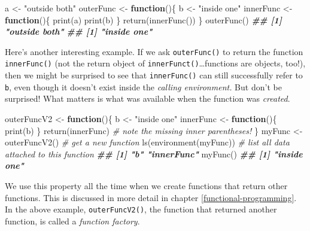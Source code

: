 \documentclass[
  12pt,
]{krantz}
\makeatletter
\newenvironment{Shaded}{\begin{snugshade}}{\end{snugshade}}
\newcommand{\CommentTok}[1]{\textcolor[rgb]{0.37,0.37,0.37}{\textit{#1}}}
\newcommand{\ControlFlowTok}[1]{\textcolor[rgb]{0.27,0.27,0.27}{\textbf{#1}}}
\newcommand{\DocumentationTok}[1]{\textcolor[rgb]{0.37,0.37,0.37}{\textbf{\textit{#1}}}}
\newcommand{\FunctionTok}[1]{\textcolor[rgb]{0,0,0}{#1}}
\newcommand{\NormalTok}[1]{#1}
\newcommand{\OtherTok}[1]{\textcolor[rgb]{0.37,0.37,0.37}{#1}}
\newcommand{\StringTok}[1]{\textcolor[rgb]{0.5,0.5,0.5}{#1}}
\newenvironment{kframe}{%
\medskip{}
\setlength{\fboxsep}{.8em}
 \def\at@end@of@kframe{}%
 \ifinner\ifhmode%
  \def\at@end@of@kframe{\end{minipage}}%
  \begin{minipage}{\columnwidth}%
 \fi\fi%
 \def\FrameCommand##1{\hskip\@totalleftmargin \hskip-\fboxsep
 \colorbox{shadecolor}{##1}\hskip-\fboxsep
     \hskip-\linewidth \hskip-\@totalleftmargin \hskip\columnwidth}%
 \MakeFramed {\advance\hsize-\width
   \@totalleftmargin\z@ \linewidth\hsize
   \@setminipage}}%
 {\par\unskip\endMakeFramed%
 \at@end@of@kframe}
\renewenvironment{Shaded}{\begin{kframe}}{\end{kframe}}
\makeatother
\begin{document}
\begin{Shaded}
\begin{Highlighting}[]
\NormalTok{a }\OtherTok{\textless{}{-}} \StringTok{"outside both"}
\NormalTok{outerFunc }\OtherTok{\textless{}{-}} \ControlFlowTok{function}\NormalTok{()\{}
\NormalTok{  b }\OtherTok{\textless{}{-}} \StringTok{"inside one"}
\NormalTok{  innerFunc }\OtherTok{\textless{}{-}} \ControlFlowTok{function}\NormalTok{()\{}
    \FunctionTok{print}\NormalTok{(a) }
    \FunctionTok{print}\NormalTok{(b)}
\NormalTok{  \}}
  \FunctionTok{return}\NormalTok{(}\FunctionTok{innerFunc}\NormalTok{())}
\NormalTok{\}}
\FunctionTok{outerFunc}\NormalTok{()}
\DocumentationTok{\#\# [1] "outside both"}
\DocumentationTok{\#\# [1] "inside one"}
\end{Highlighting}
\end{Shaded}

Here's another interesting example. If we ask \texttt{outerFunc()} to return the function \texttt{innerFunc()} (not the return object of \texttt{innerFunct()}\ldots functions are objects, too!), then we might be surprised to see that \texttt{innerFunc()} can still successfully refer to \texttt{b}, even though it doesn't exist inside the \emph{calling environment.} But don't be surprised! What matters is what was available when the function was \emph{created}.

\begin{Shaded}
\begin{Highlighting}[]
\NormalTok{outerFuncV2 }\OtherTok{\textless{}{-}} \ControlFlowTok{function}\NormalTok{()\{}
\NormalTok{  b }\OtherTok{\textless{}{-}} \StringTok{"inside one"}
\NormalTok{  innerFunc }\OtherTok{\textless{}{-}} \ControlFlowTok{function}\NormalTok{()\{}
    \FunctionTok{print}\NormalTok{(b)}
\NormalTok{  \}}
  \FunctionTok{return}\NormalTok{(innerFunc) }\CommentTok{\# note the missing inner parentheses!}
\NormalTok{\}}
\NormalTok{myFunc }\OtherTok{\textless{}{-}} \FunctionTok{outerFuncV2}\NormalTok{() }\CommentTok{\# get a new function}
\FunctionTok{ls}\NormalTok{(}\FunctionTok{environment}\NormalTok{(myFunc)) }\CommentTok{\# list all data attached to this function}
\DocumentationTok{\#\# [1] "b"         "innerFunc"}
\FunctionTok{myFunc}\NormalTok{()}
\DocumentationTok{\#\# [1] "inside one"}
\end{Highlighting}
\end{Shaded}

We use this property all the time when we create functions that return other functions. This is discussed in more detail in chapter \ref{functional-programming}. In the above example, \texttt{outerFuncV2()}, the function that returned another function, is called a \emph{function factory}.
\end{document}
